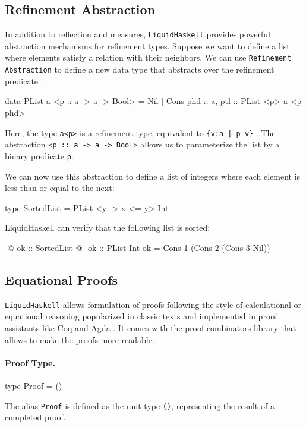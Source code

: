 \subsection{Refinement Abstraction}
In addition to reflection and measures, \texttt{LiquidHaskell} provides powerful abstraction mechanisms for refinement types.
Suppose we want to define a list where elements satisfy a relation with their neighbors. We can use \texttt{Refinement Abstraction} to define a new data type that abstracts over the refinement predicate \cite{vazou_liquidhaskell_2014}:

\begin{code}
	data PList a <p :: a -> a -> Bool> =
	Nil
	| Cons { phd :: a, ptl :: PList <p> a <p phd> }
\end{code}

Here, the type \texttt{a<p>} is a refinement type, equivalent to \texttt{\{v:a | p\ v\}} .
The abstraction \texttt{<p :: a -> a -> Bool>} allows us to parameterize the list by a binary predicate \texttt{p}.

We can now use this abstraction to define a list of integers where each element is less than or equal to the next:

\begin{code}
	type SortedList = PList <{\x y -> x <= y}> Int
\end{code}

LiquidHaskell can verify that the following list is sorted:

\begin{code}
	{-@ ok :: SortedList @-}
	ok :: PList Int
	ok = Cons 1 (Cons 2 (Cons 3 Nil))
\end{code}

\subsection{Equational Proofs}
\texttt{LiquidHaskell} allows formulation of proofs following the style of calculational or equational reasoning popularized in classic texts
and implemented in proof assistants like Coq and Agda \cite{vazou2018}.
It comes with the proof combinators library that allows to make the proofs more readable.

\paragraph{Proof Type.}
\begin{code}[label={lst:proof-type}]
	type Proof = ()
\end{code}
The alias \texttt{Proof} is defined as the unit type \texttt{()}, representing the result of a completed proof.

